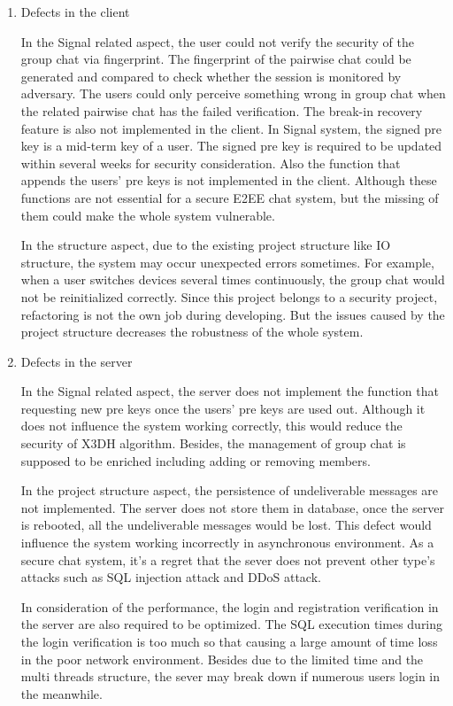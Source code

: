 \begin{enumerate}[label=(\roman*)]
\item Defects in the client

In the Signal related aspect, the user could not verify the security of the group chat via fingerprint. The fingerprint of the pairwise chat could be generated and compared to check whether the session is monitored by adversary. The users could only perceive something wrong in group chat when the related pairwise chat has the failed verification. The break-in recovery feature is also not implemented in the client. In Signal system, the signed pre key is a mid-term key of a user. The signed pre key is required to be updated within several weeks for security consideration. Also the function that appends the users' pre keys is not implemented in the client. Although these functions are not essential for a secure E2EE chat system, but the missing of them could make the whole system vulnerable.

In the structure aspect, due to the existing project structure like IO structure, the system may occur unexpected errors sometimes. For example, when a user switches devices several times continuously, the group chat would not be reinitialized correctly. Since this project belongs to a security project, refactoring is not the own job during developing. But the issues caused by the project structure decreases the robustness of the whole system.

\item Defects in the server

In the Signal related aspect, the server does not implement the function that requesting new pre keys once the users' pre keys are used out. Although it does not influence the system working correctly, this would reduce the security of X3DH algorithm. Besides, the management of group chat is supposed to be enriched including adding or removing members.

In the project structure aspect, the persistence of undeliverable messages are not implemented. The server does not store them in database, once the server is rebooted, all the undeliverable messages would be lost. This defect would influence the system working incorrectly in asynchronous environment. As a secure chat system, it's a regret that the sever does not prevent other type's attacks such as SQL injection attack and DDoS attack.

In consideration of the performance, the login and registration verification in the server are also required to be optimized. The SQL execution times during the login verification is too much so that causing a large amount of time loss in the poor network environment. Besides due to the limited time and the multi threads structure, the sever may break down if numerous users login in the meanwhile.

\end{enumerate}

